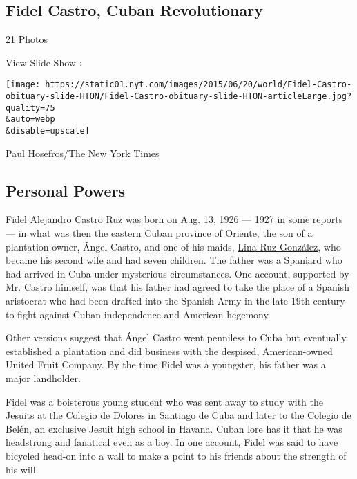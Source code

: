 \href{https://www.nytimes.com/slideshow/2016/11/26/world/americas/fidel-castro-cuban-revolutionary.html}{}

\hypertarget{fidel-castro-cuban-revolutionary}{%
\subsection{Fidel Castro, Cuban
Revolutionary}\label{fidel-castro-cuban-revolutionary}}

21 Photos

View Slide Show ›

\texttt{[image: https://static01.nyt.com/images/2015/06/20/world/Fidel-Castro-obituary-slide-HTON/Fidel-Castro-obituary-slide-HTON-articleLarge.jpg?quality=75\\\&auto=webp\\\&disable=upscale]}

Paul Hosefros/The New York Times

\hypertarget{personal-powers}{%
\subsection{Personal Powers}\label{personal-powers}}

Fidel Alejandro Castro Ruz was born on Aug. 13, 1926 --- 1927 in some
reports --- in what was then the eastern Cuban province of Oriente, the
son of a plantation owner, Ángel Castro, and one of his maids,
\href{http://timesmachine.nytimes.com/timesmachine/1963/08/08/81821103.html?pageNumber=NaN\&zoom=16}{Lina
Ruz González}, who became his second wife and had seven children. The
father was a Spaniard who had arrived in Cuba under mysterious
circumstances. One account, supported by Mr. Castro himself, was that
his father had agreed to take the place of a Spanish aristocrat who had
been drafted into the Spanish Army in the late 19th century to fight
against Cuban independence and American hegemony.

Other versions suggest that Ángel Castro went penniless to Cuba but
eventually established a plantation and did business with the despised,
American-owned United Fruit Company. By the time Fidel was a youngster,
his father was a major landholder.

Fidel was a boisterous young student who was sent away to study with the
Jesuits at the Colegio de Dolores in Santiago de Cuba and later to the
Colegio de Belén, an exclusive Jesuit high school in Havana. Cuban lore
has it that he was headstrong and fanatical even as a boy. In one
account, Fidel was said to have bicycled head-on into a wall to make a
point to his friends about the strength of his will.

